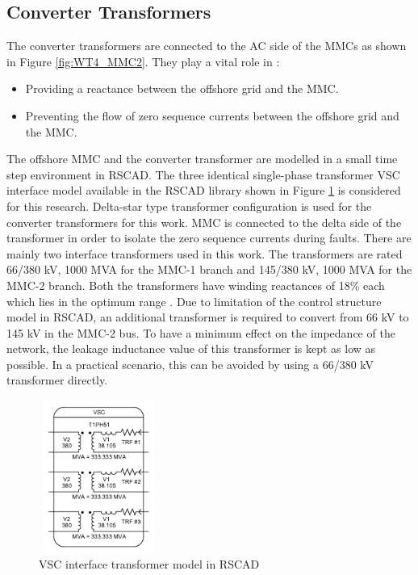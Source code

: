 \subsection{Converter Transformers}
The converter transformers are connected to the \gls{AC} side of the \gls{MMC}s  as shown in Figure \ref{fig:WT4_MMC2}. They play a vital role in \cite{cigre2005b4}:
\begin{itemize}
    \item Providing a reactance between the offshore grid and the \gls{MMC}.
    \item Preventing the flow of zero sequence currents between the offshore grid and the \gls{MMC}.
\end{itemize} 

The offshore \gls{MMC} and the converter transformer are modelled in a small time step environment in RSCAD. The three identical single-phase transformer \gls{VSC} interface model available in the RSCAD library shown in Figure \ref{fig:InterfaceTrafo} is considered for this research. Delta-star type transformer configuration is used for the converter transformers for this work. \gls{MMC} is connected to the delta side of the transformer in order to isolate the zero sequence currents during faults. There are mainly two interface transformers used in this work. The transformers are rated 66/380 kV, 1000 MVA for the \gls{MMC}-1 branch and 145/380 kV, 1000 MVA for the \gls{MMC}-2 branch. Both the transformers have winding reactances of 18\% each which lies in the optimum range \cite{cigre2005b4}. Due to limitation of the control structure model in RSCAD, an additional transformer is required to convert from 66 kV to 145 kV in the \gls{MMC}-2 bus. To have a minimum effect on the impedance of the network, the leakage inductance value of this transformer is kept as low as possible. In a practical scenario, this can be avoided by using a 66/380 kV transformer directly. 

\begin{figure}[H]
\centering
    \includegraphics[height = 5cm,width = 4cm]{Diagrams/Chapter_4/InterfaceTrafo.PNG}
    \caption{VSC interface transformer model in RSCAD}
    \label{fig:InterfaceTrafo}
\end{figure}


